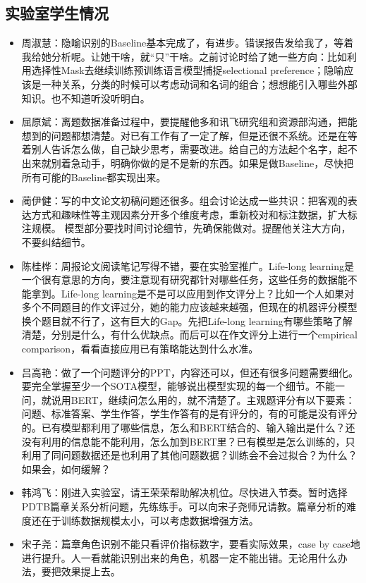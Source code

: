 \documentclass[11pt]{article}
\begin{document}
\begin{CJK}{UTF8}{gkai}
\subsection{实验室学生情况}
\begin{itemize}
\item 周淑慧：隐喻识别的Baseline基本完成了，有进步。错误报告发给我了，等着我给她分析呢。让她干啥，就“只”干啥。之前讨论时给了她一些方向：比如利用选择性Mask去继续训练预训练语言模型捕捉selectional preference；隐喻应该是一种关系，分类的时候可以考虑动词和名词的组合；想想能引入哪些外部知识。也不知道听没听明白。
\item 屈原斌：离题数据准备过程中，要提醒他多和讯飞研究组和资源部沟通，把能想到的问题都想清楚。对已有工作有了一定了解，但是还很不系统。还是在等着别人告诉怎么做，自己缺少思考，需要改进。给自己的方法起个名字，起不出来就别着急动手，明确你做的是不是新的东西。如果是做Baseline，尽快把所有可能的Baseline都实现出来。
\item 蔺伊健：写的中文论文初稿问题还很多。组会讨论达成一些共识：把客观的表达方式和趣味性等主观因素分开多个维度考虑，重新校对和标注数据，扩大标注规模。
模型部分要找时间讨论细节，先确保能做对。提醒他关注大方向，不要纠结细节。
\item 陈桂桦：周报论文阅读笔记写得不错，要在实验室推广。Life-long learning是一个很有意思的方向，要注意现有研究都针对哪些任务，这些任务的数据能不能拿到。Life-long learning是不是可以应用到作文评分上？比如一个人如果对多个不同题目的作文评过分，她的能力应该越来越强，但现在的机器评分模型换个题目就不行了，这有巨大的Gap。先把Life-long learning有哪些策略了解清楚，分别是什么，有什么优缺点。而后可以在作文评分上进行一个empirical comparison，看看直接应用已有策略能达到什么水准。
\item 吕高艳：做了一个问题评分的PPT，内容还可以，但还有很多问题需要细化。要完全掌握至少一个SOTA模型，能够说出模型实现的每一个细节。不能一问，就说用BERT，继续问怎么用的，就不清楚了。主观题评分有以下要素：问题、标准答案、学生作答，学生作答有的是有评分的，有的可能是没有评分的。已有模型都利用了哪些信息，怎么和BERT结合的、输入输出是什么？还没有利用的信息能不能利用，怎么加到BERT里？已有模型是怎么训练的，只利用了同问题数据还是也利用了其他问题数据？训练会不会过拟合？为什么？如果会，如何缓解？
\item 韩鸿飞：刚进入实验室，请王荣荣帮助解决机位。尽快进入节奏。暂时选择PDTB篇章关系分析问题，先练练手。可以向宋子尧师兄请教。篇章分析的难度还在于训练数据规模太小，可以考虑数据增强方法。
\item 宋子尧：篇章角色识别不能只看评价指标数字，要看实际效果，case by case地进行提升。人一看就能识别出来的角色，机器一定不能出错。无论用什么办法，要把效果提上去。
\end{itemize}


\end{CJK}
\end{document}
